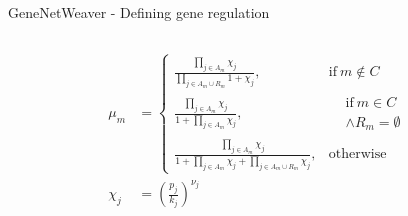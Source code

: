 \begin{frame}{GeneNetWeaver - Defining gene regulation}
\begin{columns}
\begin{column}{0.5\textwidth}
\begin{subequations}
\begin{align}
\label{eq:gnw_f.e}
\mu_m &=
\begin{cases}
  \frac{\prod_{j \in A_m} \chi_j}{\prod_{j \in A_m \cup R_m} 1 + \chi_j},
  & \text{if}\ m \notin C \\
  \frac{\prod_{j \in A_m} \chi_j}{1 + \prod_{j \in A_m} \chi_j},
  & \begin{aligned}
      &\text{if}\ m \in C \\ &\wedge R_m = \emptyset
  \end{aligned} \\
  \frac{\prod_{j \in A_m} \chi_j}{1 + \prod_{j \in A_m} \chi_j + \prod_{j \in A_m \cup R_m} \chi_j},
  & \text{otherwise}
\end{cases}
\\
\label{eq:gnw_f.f}
\chi_j &=
\left( \frac{p_j}{k_j} \right) ^ {\nu_j}
\end{align}
\end{subequations}
\end{column}
\end{columns}
\end{frame}

